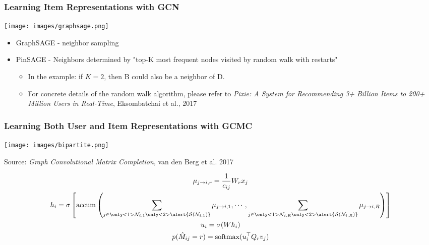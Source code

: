\documentclass[11pt]{beamer}
\begin{document}
	\begin{frame}
		\frametitle{Learning Item Representations with GCN}
		\begin{center}
			\centering
			\texttt{[image: images/graphsage.png]}
		\end{center}
		\begin{itemize}
			\item<1-> GraphSAGE - neighbor sampling
			\item<2-> PinSAGE - Neighbors determined by "top-K most frequent nodes visited by random walk with restarts"
			\begin{itemize}
				\item<3-> In the example: if $K=2$, then \textcolor{B}{B} could also be a neighbor of \textcolor{D}{D}.
				\item<4-> For concrete details of the random walk algorithm, please refer to \textit{Pixie: A System for Recommending 3+ Billion Items to 200+ Million Users in Real-Time}, Eksombatchai et al., 2017
			\end{itemize}
		\end{itemize}
	\end{frame}

	\begin{frame}
		\frametitle{Learning Both User and Item Representations with GCMC}
		\begin{center}
			\centering
			\texttt{[image: images/bipartite.png]}
			
			{\tiny Source: \textit{Graph Convolutional Matrix Completion}, van den Berg et al. 2017}
		\end{center}
			$$
			\begin{gathered}
			\mu_{j \to i, r} = \dfrac{1}{c_{ij}} W_r x_j\\
			h_i = \sigma \left[\mathrm{accum}\left(
			\sum_{j \in \only<1>{\mathcal{N}_{i,1}}\only<2>{\alert{\mathcal{S}(\mathcal{N}_{i,1})}}} \mu_{j \to i, 1},
			\cdots,
			\sum_{j \in \only<1>{\mathcal{N}_{i,R}}\only<2>{\alert{\mathcal{S}(\mathcal{N}_{i,R})}}} \mu_{j \to i, R}
			\right) \right] \\
			u_i = \sigma(W h_i)\\
			p(\hat{M}_{ij}=r) = \mathrm{softmax}(u_i^\top Q_r v_j)
			\end{gathered}
			$$
	\end{frame}
\end{document}
